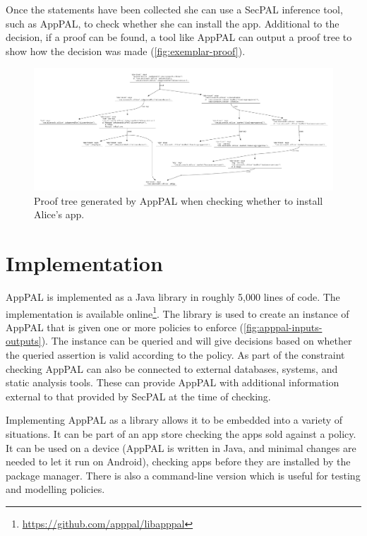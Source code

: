\documentclass[thesis.tex]{subfiles}
\begin{document}
Once the statements have been collected she can use a SecPAL inference tool, such as AppPAL, to check whether she can install the app.
Additional to the decision, if a proof can be found, a tool like AppPAL can output a proof tree to show how the decision was made (\autoref{fig:exemplar-proof}). 

\begin{figure}
  \centering
  \includegraphics[width=1.0\textheight, angle=90]{figures/exemplar-proof.pdf}
  \caption[Proof tree output by AppPAL]{Proof tree generated by AppPAL when checking whether to install Alice's app.}
  \label{fig:exemplar-proof}
\end{figure}

\section{Implementation}
\label{sec:implementation}

AppPAL is implemented as a Java library in roughly 5,000 lines of code.
The implementation is available online\footnote{\url{https://github.com/apppal/libapppal}}.
The library is used to create an instance of AppPAL that is given one or more policies to enforce (\autoref{fig:apppal-inputs-outputs}).
The instance can be queried and will give decisions based on whether the queried assertion is valid according to the policy.
As part of the constraint checking AppPAL can also be connected to external databases, systems, and static analysis tools.
These can provide AppPAL with additional information external to that provided by SecPAL at the time of checking.

Implementing AppPAL as a library allows it to be embedded into a variety of situations.
It can be part of an app store checking the apps sold against a policy.
It can be used on a device (AppPAL is written in Java, and minimal changes are needed to let it run on Android), checking apps before they are installed by the package manager.
There is also a command-line version which is useful for testing and modelling policies.
\end{document}
